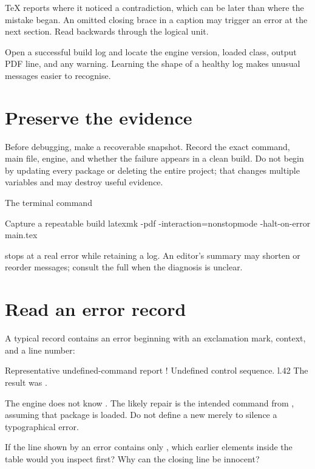TeX reports where it noticed a contradiction, which can be later than where the
mistake began. An omitted closing brace in a caption may trigger an error at the
next section. Read backwards through the logical unit.

\begin{tryit}
Open a successful build log and locate the engine version, loaded class, output
PDF line, and any warning. Learning the shape of a healthy log makes unusual
messages easier to recognise.
\end{tryit}

\section{Preserve the evidence}

Before debugging, make a recoverable snapshot. Record the exact command, main
file, engine, and whether the failure appears in a clean build. Do not begin by
updating every package or deleting the entire project; that changes multiple
variables and may destroy useful evidence.

The terminal command

\begin{terminalcode}{Capture a repeatable build}
latexmk -pdf -interaction=nonstopmode -halt-on-error main.tex
\end{terminalcode}

stops at a real error while retaining a log. An editor's summary may shorten or
reorder messages; consult the full  when the diagnosis is unclear.

\section{Read an error record}

A typical record contains an error beginning with an exclamation mark, context,
and a line number:

\begin{terminalcode}{Representative undefined-command report}
! Undefined control sequence.
l.42 The result was .
\end{terminalcode}

The engine does not know . The likely repair is the intended
 command from , assuming that package is loaded. Do not
define a new  merely to silence a typographical error.

\begin{pausepredict}
If the line shown by an error contains only , which
earlier elements inside the table would you inspect first? Why can the closing
line be innocent?
\end{pausepredict}

